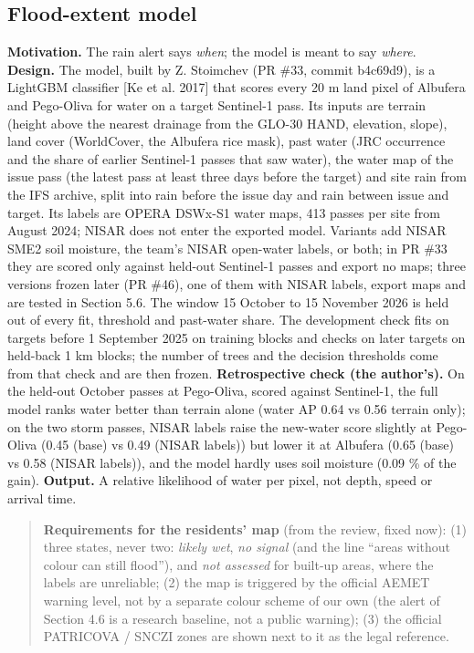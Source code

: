 \documentclass[10pt,twocolumn]{article}
\begin{document}
\subsection{Flood-extent model}
\textbf{Motivation.} The rain alert says \emph{when}; the model is meant to say \emph{where}. \textbf{Design.} The model, built by Z. Stoimchev (PR \#33, commit b4c69d9), is a LightGBM classifier [Ke et al. 2017] that scores every 20 m land pixel of Albufera and Pego-Oliva for water on a target Sentinel-1 pass. Its inputs are terrain (height above the nearest drainage from the GLO-30 HAND, elevation, slope), land cover (WorldCover, the Albufera rice mask), past water (JRC occurrence and the share of earlier Sentinel-1 passes that saw water), the water map of the issue pass (the latest pass at least three days before the target) and site rain from the IFS archive, split into rain before the issue day and rain between issue and target. Its labels are OPERA DSWx-S1 water maps, 413 passes per site from August 2024; NISAR does not enter the exported model. Variants add NISAR SME2 soil moisture, the team's NISAR open-water labels, or both; in PR \#33 they are scored only against held-out Sentinel-1 passes and export no maps; three versions frozen later (PR \#46), one of them with NISAR labels, export maps and are tested in Section 5.6. The window 15 October to 15 November 2026 is held out of every fit, threshold and past-water share. The development check fits on targets before 1 September 2025 on training blocks and checks on later targets on held-back 1 km blocks; the number of trees and the decision thresholds come from that check and are then frozen. \textbf{Retrospective check (the author's).} On the held-out October passes at Pego-Oliva, scored against Sentinel-1, the full model ranks water better than terrain alone (water AP 0.64 vs 0.56 terrain only); on the two storm passes, NISAR labels raise the new-water score slightly at Pego-Oliva (0.45 (base) vs 0.49 (NISAR labels)) but lower it at Albufera (0.65 (base) vs 0.58 (NISAR labels)), and the model hardly uses soil moisture (0.09 \% of the gain). \textbf{Output.} A relative likelihood of water per pixel, not depth, speed or arrival time.

\begin{quote}\small
\textbf{Requirements for the residents' map} (from the review, fixed now): (1) three states, never two: \emph{likely wet}, \emph{no signal} (and the line ``areas without colour can still flood''), and \emph{not assessed} for built-up areas, where the labels are unreliable; (2) the map is triggered by the official AEMET warning level, not by a separate colour scheme of our own (the alert of Section 4.6 is a research baseline, not a public warning); (3) the official PATRICOVA / SNCZI zones are shown next to it as the legal reference.
\end{quote}
\end{document}
